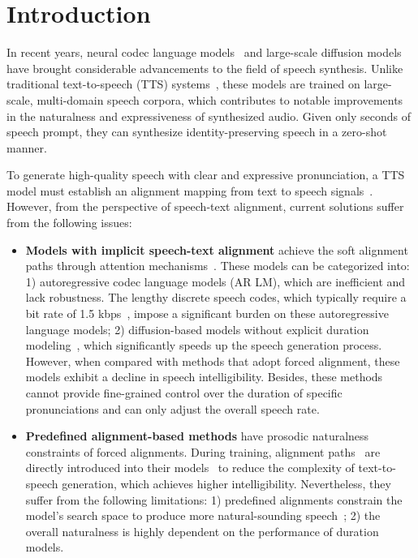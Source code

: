 \section{Introduction}
In recent years, neural codec language models~\citep{wang2023neural,zhang2023speak,song2024ella,xin2024rall} and large-scale diffusion models ~\citep{shen2023naturalspeech,le2023Voicebox,lee2024ditto,eskimez2024e2,ju2024naturalspeech,yang2024simplespeech,yang2024simplespeech2} have brought considerable advancements to the field of speech synthesis. Unlike traditional text-to-speech (TTS) systems~\citep{shen2018natural,jia2018transfer,li2019neural,kim2020glow,ren2019fastspeech,kim2021conditional,kim2022guided}, these models are trained on large-scale, multi-domain speech corpora, which contributes to notable improvements in the naturalness and expressiveness of synthesized audio. Given only seconds of speech prompt, they can synthesize identity-preserving speech in a zero-shot manner.

To generate high-quality speech with clear and expressive pronunciation, a TTS model must establish an alignment mapping from text to speech signals~\citep{kim2020glow,tan2021survey}. However, from the perspective of speech-text alignment, current solutions suffer from the following issues:


\begin{itemize}
    \item \textbf{Models with implicit speech-text alignment} achieve the soft alignment paths through attention mechanisms~\citep{wang2023neural,chen2024vall,du2024cosyvoice}. These models can be categorized into: 1) autoregressive codec language models (AR LM), which are inefficient and lack robustness. The lengthy discrete speech codes, which typically require a bit rate of 1.5 kbps~\citep{kumar2024high,wu2024towards}, impose a significant burden on these autoregressive language models; 2) diffusion-based models without explicit duration modeling~\citep{lee2024ditto,eskimez2024e2,lovelace2023simple,gao2023e3,cambara2024mapache,yang2024simplespeech,yang2024simplespeech2}, which significantly speeds up the speech generation process. However, when compared with methods that adopt forced alignment, these models exhibit a decline in speech intelligibility. Besides, these methods cannot provide fine-grained control over the duration of specific pronunciations and can only adjust the overall speech rate.

    \item \textbf{Predefined alignment-based methods} have prosodic naturalness constraints of forced alignments. During training, alignment paths~\citep{ren2020fastspeech,kim2020glow} are directly introduced into their models~\citep{le2023Voicebox,shen2023naturalspeech,ju2024naturalspeech} to reduce the complexity of text-to-speech generation, which achieves higher intelligibility. Nevertheless, they suffer from the following limitations: 1) predefined alignments constrain the model's search space to produce more natural-sounding speech~\citep{anastassiou2024seed,chen2024vall}; 2) the overall naturalness is highly dependent on the performance of duration models.
\end{itemize}

